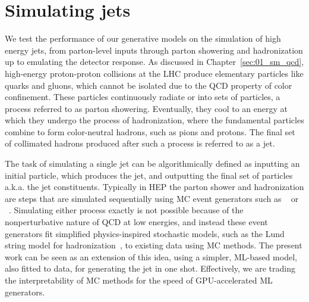 
\section{Simulating jets}
\label{sec:04_jetnet_jets}

We test the performance of our generative models on the simulation of high energy jets, from parton-level inputs through parton showering and hadronization up to emulating the detector response.
As discussed in Chapter~\ref{sec:01_sm_qcd}, high-energy proton-proton collisions at the LHC produce elementary particles like quarks and gluons, which cannot be isolated due to the QCD property of color confinement.
These particles continuously radiate or into sets of particles, a process referred to as parton showering. 
Eventually, they cool to an energy at which they undergo the process of hadronization, where the fundamental particles combine to form color-neutral hadrons, such as pions and protons. 
The final set of collimated hadrons produced after such a process is referred to as a jet. 

The task of simulating a single jet can be algorithmically defined as inputting an initial particle, which produces the jet, and outputting the final set of particles a.k.a. the jet constituents. 
Typically in HEP the parton shower and hadronization are steps that are simulated sequentially using MC event generators such as \PYTHIA~\cite{pythia} or \HERWIG~\cite{herwig}. 
Simulating either process exactly is not possible because of the nonperturbative nature of QCD at low energies, and instead these event generators fit simplified physics-inspired stochastic models, such as the Lund string model for hadronization~\cite{Andersson:1983ia}, to existing data using MC methods.
The present work can be seen as an extension of this idea, using a simpler, ML-based model, also fitted to data, for generating the jet in one shot.
Effectively, we are trading the interpretability of MC methods for the speed of GPU-accelerated ML generators. 


